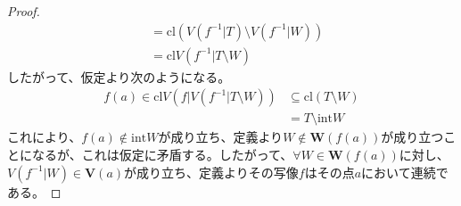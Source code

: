 \documentclass[dvipdfmx]{jsarticle}
\begin{document}
\begin{proof}
\begin{align*}
&= {\mathrm{cl}}\left( V\left( f^{- 1}|T \right) \setminus V\left( f^{- 1}|W \right) \right)\\
&= {\mathrm{cl}}{V\left( f^{- 1}|T \setminus W \right)}
\end{align*}
したがって、仮定より次のようになる。
\begin{align*}
f(a) \in {\mathrm{cl}}{V\left( f|V\left( f^{- 1}|T \setminus W \right) \right)} &\subseteq {\mathrm{cl}}(T \setminus W)\\
&= T \setminus {\mathrm{int}}W
\end{align*}
これにより、$f(a) \notin {\mathrm{int}}W$が成り立ち、定義より$W \notin \mathbf{W}\left( f(a) \right)$が成り立つことになるが、これは仮定に矛盾する。したがって、$\forall W \in \mathbf{W}\left( f(a) \right)$に対し、$V\left( f^{- 1}|W \right) \in \mathbf{V}(a)$が成り立ち、定義よりその写像$f$はその点$a$において連続である。
\end{proof}
\end{document}
